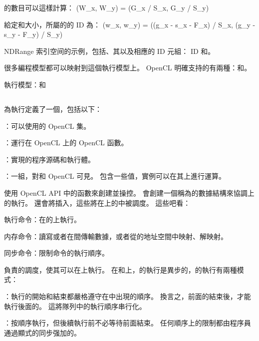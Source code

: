 的數目可以這樣計算：
\startformula
(W_x, W_y) = (G_x / S_x, G_y / S_y)
\stopformula

給定和大小，所屬的的 ID 為：
\startformula
(w_x, w_y) = ((g_x - s_x - F_x) / S_x, (g_y - s_y - F_y) / S_y)
\stopformula

\startbuffer[buffigindexspacecaption]
NDRange 索引空间的示例，包括、其以及相應的 ID 元組： ID 和。
\stopbuffer
{}
{}

很多編程模型都可以映射到這個執行模型上。
OpenCL 明確支持的有兩種：和。

\startbuffer[buftitleemccmdq]
執行模型：和
\stopbuffer
\subsection{\getbuffer[buftitleemccmdq]}

為執行定義了一個，包括以下：
\startigNum
\item {}：可以使用的 OpenCL 集。
\item {}：運行在 OpenCL 上的 OpenCL 函數。
\item {}：實現的程序源碼和執行體。
\item {}：一組，對和 OpenCL 可見。
包含一些值，實例可以在其上進行運算。
\stopigBase

使用 OpenCL API 中的函數來創建並操控。
會創建一個稱為的數據結構來協調上的執行。
還會將插入，這些將在上的中被調度。
這些吧看：
\startigBase
\item {\ftEmp {}執行命令：}在的上執行。
\item {\ftEmp 内存命令：}讀寫或者在間傳輸數據，或者從的地址空間中映射、解映射。
\item {\ftEmp 同步命令：}限制命令的執行順序。
\stopigBase

負責的調度，使其可以在上執行。
在和上，的執行是異步的，的執行有兩種模式：
\startigBase
\item {\ftEmp {}：}執行的開始和結束都嚴格遵守在中出現的順序。
換言之，前面的結束後，才能執行後面的。
這將隊列中的執行順序串行化。
\item {\ftEmp {}：}按順序執行，但後續執行前不必等待前面結束。
任何順序上的限制都由程序員通過顯式的同步强加的。
\stopigBase

